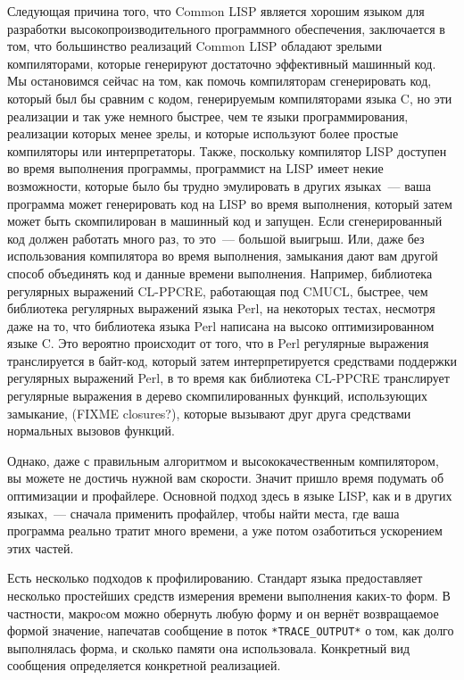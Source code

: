 Следующая причина того, что Common LISP является хорошим языком для разработки
высокопроизводительного программного обеспечения, заключается в том, что большинство
реализаций Common LISP обладают зрелыми компиляторами, которые генерируют достаточно
эффективный машинный код. Мы остановимся сейчас на том, как помочь компиляторам
сгенерировать код, который был бы сравним с кодом, генерируемым компиляторами языка C, но
эти реализации и так уже немного быстрее, чем те языки программирования, реализации
которых менее зрелы, и которые используют более простые компиляторы или
интерпретаторы. Также, поскольку компилятор LISP доступен во время выполнения программы,
программист на LISP имеет некие возможности, которые было бы трудно эмулировать в других
языках~--- ваша программа может генерировать код на LISP во время выполнения, который затем
может быть скомпилирован в машинный код и запущен. Если сгенерированный код должен
работать много раз, то это~--- большой выигрыш. Или, даже без использования компилятора во
время выполнения, замыкания дают вам другой способ объединять код и данные времени
выполнения. Например, библиотека регулярных выражений CL-PPCRE, работающая под CMUCL,
быстрее, чем библиотека регулярных выражений языка Perl, на некоторых тестах, несмотря
даже на то, что библиотека языка Perl написана на высоко оптимизированном языке C. Это
вероятно происходит от того, что в Perl регулярные выражения транслируется в байт-код,
который затем интерпретируется средствами поддержки регулярных выражений Perl, в то время
как библиотека CL-PPCRE транслирует регулярные выражения в дерево скомпилированных
функций, использующих замыкание, (FIXME closures?), которые вызывают друг друга средствами
нормальных вызовов функций.

Однако, даже с правильным алгоритмом и высококачественным компилятором, вы можете не
достичь нужной вам скорости. Значит пришло время подумать об оптимизации и
профайлере. Основной подход здесь в языке LISP, как и в других языках,~--- сначала
применить профайлер, чтобы найти места, где ваша программа реально тратит много времени, а
уже потом озаботиться ускорением этих частей.

Есть несколько подходов к профилированию. Стандарт языка предоставляет несколько
простейших средств измерения времени выполнения каких-то форм. В частности, макроcом
 можно обернуть любую форму и он вернёт возвращаемое формой значение, напечатав
сообщение в поток \lstinline!*TRACE_OUTPUT*! о том, как долго выполнялась форма, и сколько
памяти она использовала. Конкретный вид сообщения определяется конкретной реализацией.

